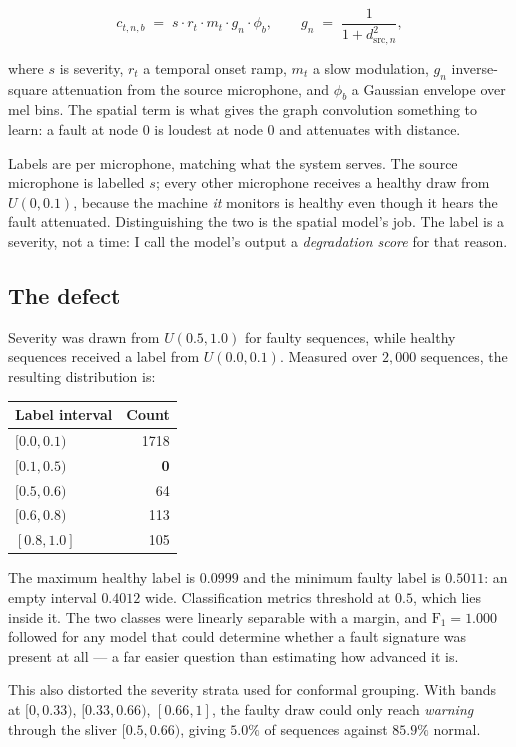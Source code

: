 \documentclass[11pt]{article}
\begin{document}
\[
c_{t,n,b} \;=\; s \cdot r_t \cdot m_t \cdot g_n \cdot \phi_b ,
\qquad
g_n \;=\; \frac{1}{1 + d_{\mathrm{src},n}^{2}} ,
\]

where $s$ is severity, $r_t$ a temporal onset ramp, $m_t$ a slow modulation,
$g_n$ inverse-square attenuation from the source microphone, and $\phi_b$ a
Gaussian envelope over mel bins. The spatial term is what gives the graph
convolution something to learn: a fault at node $0$ is loudest at node $0$ and
attenuates with distance.

Labels are per microphone, matching what the system serves. The source
microphone is labelled $s$; every other microphone receives a healthy draw from
$U(0, 0.1)$, because the machine \emph{it} monitors is healthy even though it
hears the fault attenuated. Distinguishing the two is the spatial model's job.
The label is a severity, not a time: I call the model's output a
\emph{degradation score} for that reason.

\subsection{The defect}

Severity was drawn from $U(0.5, 1.0)$ for faulty sequences, while healthy
sequences received a label from $U(0.0, 0.1)$. Measured over $2{,}000$
sequences, the resulting distribution is:

\begin{center}
\begin{tabular}{lr}
\toprule
Label interval & Count \\
\midrule
$[0.0, 0.1)$ & 1718 \\
$[0.1, 0.5)$ & \textbf{0} \\
$[0.5, 0.6)$ & 64 \\
$[0.6, 0.8)$ & 113 \\
$[0.8, 1.0]$ & 105 \\
\bottomrule
\end{tabular}
\end{center}

The maximum healthy label is $0.0999$ and the minimum faulty label is $0.5011$:
an empty interval $0.4012$ wide. Classification metrics threshold at $0.5$,
which lies inside it. The two classes were linearly separable with a margin, and
$\mathrm{F}_1 = 1.000$ followed for any model that could determine whether a
fault signature was present at all --- a far easier question than estimating how
advanced it is.

This also distorted the severity strata used for conformal grouping. With bands
at $[0, 0.33)$, $[0.33, 0.66)$, $[0.66, 1]$, the faulty draw could only reach
\emph{warning} through the sliver $[0.5, 0.66)$, giving $5.0\%$ of sequences
against $85.9\%$ normal.
\end{document}
